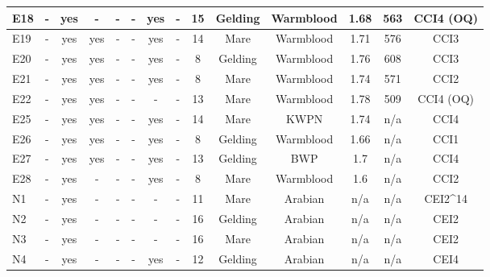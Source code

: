 \begin{table}[!htbp]
{\begin{tabular}{|l|c|c|c|c|c|c|c|c|c|c|c|c|c|}
        E18 & - & yes & - & - & - & yes & - & 15 & Gelding & Warmblood & 1.68 & 563 &  CCI4 (OQ) \\ \hline
        E19 & - & yes & yes & - & - & yes & - & 14 & Mare & Warmblood & 1.71 & 576 &  CCI3\\ \hline
        E20 & - & yes & yes & - & - & yes & - & 8 & Gelding & Warmblood & 1.76 & 608 &  CCI3 \\ \hline
        E21 & - & yes & yes & - & - & yes & - & 8 & Mare & Warmblood & 1.74 & 571 &  CCI2 \\ \hline
        E22 & - & yes & yes & - & - & - & - & 13 & Mare & Warmblood & 1.78 & 509 &  CCI4 (OQ) \\ \hline
        E25 & - & yes & yes & - & - & yes & - & 14 & Mare & KWPN & 1.74 & n/a &  CCI4  \\ \hline
        E26 & - & yes & yes & - & - & yes & - & 8 & Gelding & Warmblood & 1.66 & n/a &  CCI1 \\ \hline
        E27 & - & yes & yes & - & - & yes & - & 13 & Gelding & BWP & 1.7 & n/a &  CCI4  \\ \hline
        E28 & - & yes & - & - & - & yes & - & 8 & Mare & Warmblood & 1.6 & n/a &  CCI2  \\ \hline
        N1 & - & yes & - & - & - & - & - & 11 & Mare & Arabian & n/a & n/a &  CEI2^{14}  \\ \hline
        N2 & - & yes & - & - & - & - & - & 16 & Gelding & Arabian & n/a & n/a &  CEI2  \\ \hline
        N3 & - & yes & - & - & - & - & - & 16 & Mare & Arabian & n/a & n/a &  CEI2  \\ \hline
        N4 & - & yes & - & - & - & yes & - & 12 & Gelding & Arabian & n/a & n/a &  CEI4  \\ \hline

\end{tabular}}
\end{table}
